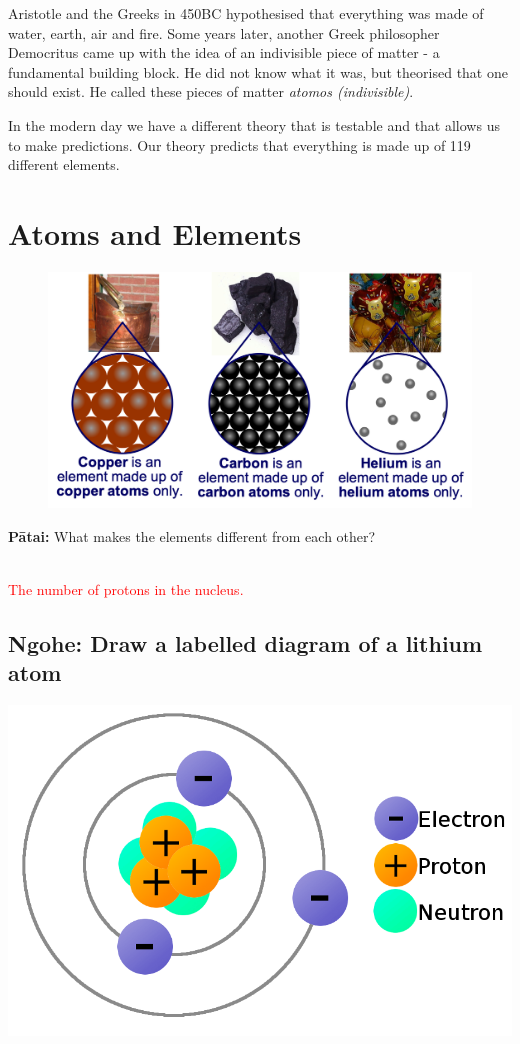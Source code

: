 \documentclass[12pt]{report}
\makeatletter
\DeclareRobustCommand{\StudentVSpace}[2]{%
	\ifthenelse{\boolean{@answer}}
	{\textcolor{red}{\\#1}}
	{\vspace{#2}}
}
\makeatother
\begin{document}
Aristotle and the Greeks in 450BC hypothesised that everything was made of water, earth, air and fire. Some years later, another Greek philosopher Democritus came up with the idea of an indivisible piece of matter - a fundamental building block. He did not know what it was, but theorised that one should exist. He called these pieces of matter \textit{atomos (indivisible)}.

In the modern day we have a different theory that is testable and that allows us to make predictions. Our theory predicts that everything is made up of 119 different elements.

\section{Atoms and Elements}

\begin{figure}
	\vspace{-1cm}
	\begin{center}
		\includegraphics[width=0.9\linewidth]{elements.png}
	\end{center}
\end{figure}

\textbf{Pātai:} What makes the elements different from each other?

\StudentVSpace{The number of protons in the nucleus.}{2cm}

\subsection{Ngohe: Draw a labelled diagram of a lithium atom}
	{\includegraphics[width=0.3\linewidth]{lithium-atom.png}}
	{}
\end{document}
